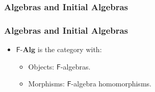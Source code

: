\documentclass{beamer}
\DeclareMathOperator{\obj}{O}
\DeclareMathOperator{\mor}{M}
\newcommand{\catbf}[1]{\ensuremath{\mathbf{#1}}\xspace}
\newcommand{\alg}{\catbf{Alg}}
\newcommand{\func}[1]{\ensuremath{\mathsf{#1}}}
\newcommand{\funcO}[1]{\ensuremath{\func{#1}_{\obj}}}
\newcommand{\funcM}[1]{\ensuremath{\func{#1}_{\mor}}}
\begin{document}

\begin{frame}
  \frametitle{Algebras and Initial Algebras}

  \begin{definition}
  \end{definition}
  \begin{center}
  \end{center}

\end{frame}


\begin{frame}
  \frametitle{Algebras and Initial Algebras}

  \begin{definition}
    \begin{itemize}
    \item
      \func{F}-\alg is the category with:
      \begin{itemize}
      \item
        Objects: \func{F}-algebras.
      \item
        Morphisms: \func{F}-algebra homomorphisms.
      \end{itemize}
    \end{itemize}
  \end{definition}

\end{frame}

\end{document}
